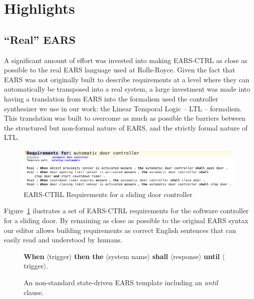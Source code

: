 \section{Highlights}

\subsection{``Real'' EARS}

A significant amount of effort was invested into making \textsf{EARS-CTRL} as close as
possible to the real EARS language used at Rolls-Royce. Given the fact that
EARS was not originally built to describe requirements at a level where they can
automatically be transposed into a real system, a large investment was made into
having a translation from EARS into the formalism used the controller
synthesizer we use in our work: the Linear Temporal Logic -- LTL -- formalism.
This translation was built to overcome as much as possible the barriers between the structured but non-formal nature of
EARS, and the strictly formal nature of LTL.

\begin{figure}[h!]
   \begin{center}
     \includegraphics[width=1\textwidth]{images/EARS-Reqs.png}
     \caption{\textsf{EARS-CTRL} Requirements for a sliding door controller}
     \label{fig:ears_reqs}
   \end{center}
 \end{figure}
 
Figure~\ref{fig:ears_reqs} ilustrates a set of \textsf{EARS-CTRL} requirements
for the software controller for a sliding door. By remaining as close as
possible to the original EARS syntax our editor allows building requirements as
correct English sentences that can easily read and understood by humans.

\begin{figure}[h!]
\begin{center}
\textbf{When} $\langle$trigger$\rangle$ \textbf{then the}
$\langle$system name$\rangle$ \textbf{shall}
$\langle$response$\rangle$ \textbf{until}
$\langle$trigger$\rangle$.
\caption{An non-standard state-driven EARS template including an \emph{until}
clause.}
\label{fig:ears_template_while}
\end{center}
\end{figure}

